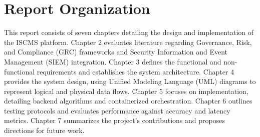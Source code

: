 \section{Report Organization}
This report consists of seven chapters detailing the design and implementation of the ISCMS platform. Chapter 2 evaluates literature regarding Governance, Risk, and Compliance (GRC) frameworks and Security Information and Event Management (SIEM) integration. Chapter 3 defines the functional and non-functional requirements and establishes the system architecture. Chapter 4 provides the system design, using Unified Modeling Language (UML) diagrams to represent logical and physical data flows. Chapter 5 focuses on implementation, detailing backend algorithms and containerized orchestration. Chapter 6 outlines testing protocols and evaluates performance against accuracy and latency metrics. Chapter 7 summarizes the project's contributions and proposes directions for future work.
